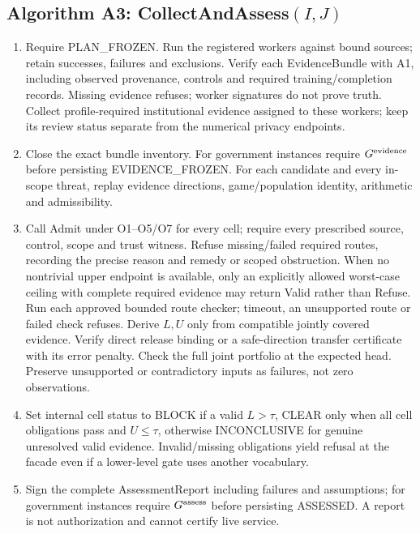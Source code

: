 \subsection{Algorithm A3: CollectAndAssess$(I,J)$}
\begin{enumerate}
\item Require PLAN\_FROZEN. Run the registered workers against bound sources;
retain successes, failures and exclusions. Verify each EvidenceBundle with
A1, including observed provenance, controls and required training/completion
records. Missing evidence refuses; worker signatures do not prove truth.
Collect profile-required institutional evidence assigned to these workers;
keep its review status separate from the numerical privacy endpoints.
\item Close the exact bundle inventory. For government instances require
$G^{\rm evidence}$ before persisting EVIDENCE\_FROZEN.
For each candidate and every in-scope threat, replay evidence directions,
game/population identity, arithmetic and admissibility.
\item Call Admit under O1--O5/O7 for every cell; require every prescribed
source, control, scope and trust witness. Refuse missing/failed required
routes, recording the precise reason and remedy or scoped obstruction.
When no nontrivial upper endpoint is available, only an explicitly allowed
worst-case ceiling with complete required evidence may return Valid rather
than Refuse. Run each approved bounded route checker; timeout, an unsupported
route or failed check refuses. Derive $L,U$ only from compatible jointly
covered evidence. Verify direct
release binding or a safe-direction transfer certificate with its error
penalty. Check the full joint portfolio at the expected head. Preserve
unsupported or contradictory inputs as failures, not zero observations.
\item Set internal cell status to BLOCK if a valid $L>\tau$, CLEAR only when
all cell obligations pass and $U\le\tau$, otherwise INCONCLUSIVE for genuine
unresolved valid evidence. Invalid/missing obligations yield refusal at the
facade even if a lower-level gate uses another vocabulary.
\item Sign the complete AssessmentReport including failures and assumptions;
for government instances require $G^{\rm assess}$ before persisting ASSESSED.
A report is not authorization and cannot certify live service.
\end{enumerate}

